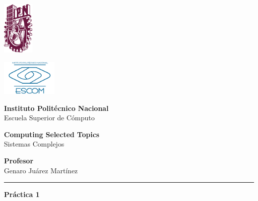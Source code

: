 \documentclass[10pt]{article}
\newcommand{\HRule}{\textcolor{blueTitle}{\rule{\linewidth}{0.5mm}}}
\begin{document}
    \thispagestyle{empty}

    \begin{center}
        \begin{minipage}{0.48\textwidth}
            \begin{flushleft}
                \hspace{1cm}\includegraphics[width=1.5cm]{ipn.png}
            \end{flushleft}
        \end{minipage}
        \begin{minipage} {0.48\textwidth}
            \begin{flushright}
                \includegraphics[width=2.7cm]{escom.png}
            \end{flushright}
        \end{minipage}

        \vspace*{-2cm}

        \LARGE
        \textcolor{blueTitle}{\textbf{Instituto Politécnico Nacional\\}}
        \LARGE
        \textcolor{blueTitle}{Escuela Superior de Cómputo}

        \vspace{2cm}
        
        \Large
        \textbf{Computing Selected Topics} \\
        \vspace{.3cm}
        Sistemas Complejos
        \vspace{1.5cm}
        
        \Large
        \textbf{Profesor} \\
        \vspace{.3cm}
        Genaro Juárez Martínez
        \vspace{1cm}
        
        \HRule
        \vspace{.4cm}
        {\textbf{Práctica 1} \smallskip
        
}
\end{center}
\end{document}

